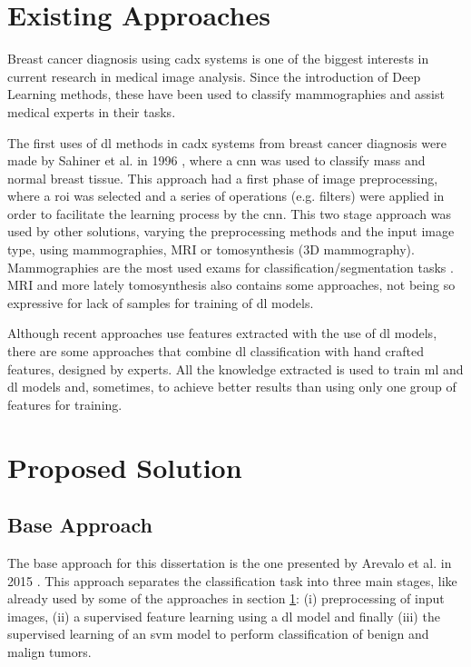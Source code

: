 \documentclass[
  twoside,
  11pt, a4paper,
  footinclude=true,
  headinclude=true,
  cleardoublepage=empty
]{scrbook}
\begin{document}
    \section{Existing Approaches} \label{problem:approaches}
      Breast cancer diagnosis using \gls{cadx} systems is one of the biggest interests in current research in medical image analysis. Since the introduction of Deep Learning methods, these have been used to classify mammographies and assist medical experts in their tasks.

      The first uses of \gls{dl} methods in \gls{cadx} systems from breast cancer diagnosis were made by Sahiner et al. in 1996 \cite{sahiner1996classification}, where a \gls{cnn} was used to classify mass and normal breast tissue. This approach had a first phase of image preprocessing, where a \gls{roi} was selected and a series of operations (e.g. filters) were applied in order to facilitate the learning process by the \gls{cnn}. This two stage approach was used by other solutions, varying the preprocessing methods and the input image type, using mammographies, MRI or tomosynthesis (3D mammography).
      Mammographies are the most used exams for classification/segmentation tasks \cite{sahiner1996classification,fonseca2015automatic,huynh2016digital,dhungel2016automated}.  MRI \cite{dalmis2017using} and more lately tomosynthesis \cite{fotin2016detection} also contains some approaches, not being so expressive for lack of samples for training of \gls{dl} models.

      Although recent approaches use features extracted with the use of \gls{dl} models, there are some approaches \cite{dhungel2016automated,kooi2016large,arevalo2016representation} that combine \gls{dl} classification with hand crafted features, designed by experts. All the knowledge extracted is used to train \gls{ml} and \gls{dl} models and, sometimes, to achieve better results than using only one group of features for training.

    \section{Proposed Solution} \label{problem:proposal}
      \subsection{Base Approach}
        The base approach for this dissertation is the one presented by Arevalo et al. in 2015 \cite{arevalo2016representation}. This approach separates the classification task into three main stages, like already used by some of the approaches in section \ref{problem:approaches}: (i) preprocessing of input images, (ii) a supervised feature learning using a \gls{dl} model and finally (iii) the supervised learning of an \gls{svm} model to perform classification of benign and malign tumors.
\end{document}
